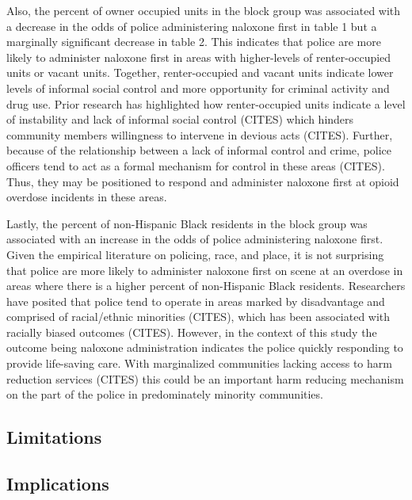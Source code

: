 Also, the percent of owner occupied units in the block group was associated with a decrease in the odds of police administering naloxone first in table 1 but a marginally significant decrease in table 2. This indicates that police are more likely to administer naloxone first in areas with higher-levels of renter-occupied units or vacant units. Together, renter-occupied and vacant units indicate lower levels of informal social control and more opportunity for criminal activity and drug use. Prior research has highlighted how renter-occupied units indicate a level of instability and lack of informal social control (CITES) which hinders community members willingness to intervene in devious acts (CITES). Further, because of the relationship between a lack of informal control and crime, police officers tend to act as a formal mechanism for control in these areas (CITES). Thus, they may be positioned to respond and administer naloxone first at opioid overdose incidents in these areas.

Lastly, the percent of non-Hispanic Black residents in the block group was associated with an increase in the odds of police administering naloxone first. Given the empirical literature on policing, race, and place, it is not surprising that police are more likely to administer naloxone first on scene at an overdose in areas where there is a higher percent of non-Hispanic Black residents. Researchers have posited that police tend to operate in areas marked by disadvantage and comprised of racial/ethnic minorities (CITES), which has been associated with racially biased outcomes (CITES). However, in the context of this study the outcome being naloxone administration indicates the police quickly responding to provide life-saving care. With marginalized communities lacking access to harm reduction services (CITES) this could be an important harm reducing mechanism on the part of the police in predominately minority communities.

\subsection{Limitations}

\subsection{Implications}


